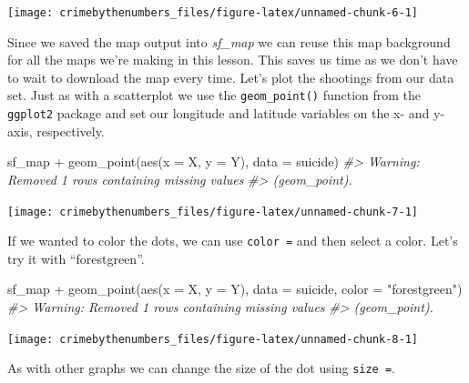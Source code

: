 \documentclass[
]{krantz}
\makeatletter
\newenvironment{Shaded}{\begin{snugshade}}{\end{snugshade}}
\newcommand{\AttributeTok}[1]{\textcolor[rgb]{0.61,0.61,0.61}{#1}}
\newcommand{\CommentTok}[1]{\textcolor[rgb]{0.37,0.37,0.37}{\textit{#1}}}
\newcommand{\FunctionTok}[1]{\textcolor[rgb]{0,0,0}{#1}}
\newcommand{\NormalTok}[1]{#1}
\newcommand{\SpecialCharTok}[1]{\textcolor[rgb]{0,0,0}{#1}}
\newcommand{\StringTok}[1]{\textcolor[rgb]{0.5,0.5,0.5}{#1}}
\newenvironment{kframe}{%
\medskip{}
\setlength{\fboxsep}{.8em}
 \def\at@end@of@kframe{}%
 \ifinner\ifhmode%
  \def\at@end@of@kframe{\end{minipage}}%
  \begin{minipage}{\columnwidth}%
 \fi\fi%
 \def\FrameCommand##1{\hskip\@totalleftmargin \hskip-\fboxsep
 \colorbox{shadecolor}{##1}\hskip-\fboxsep
     \hskip-\linewidth \hskip-\@totalleftmargin \hskip\columnwidth}%
 \MakeFramed {\advance\hsize-\width
   \@totalleftmargin\z@ \linewidth\hsize
   \@setminipage}}%
 {\par\unskip\endMakeFramed%
 \at@end@of@kframe}
\renewenvironment{Shaded}{\begin{kframe}}{\end{kframe}}
\makeatother
\begin{document}
\begin{center}\texttt{[image: crimebythenumbers\_files/figure-latex/unnamed-chunk-6-1]} \end{center}

Since we saved the map output into \emph{sf\_map} we can reuse this map background for all the maps we're making in this lesson. This saves us time as we don't have to wait to download the map every time. Let's plot the shootings from our data set. Just as with a scatterplot we use the \texttt{geom\_point()} function from the \texttt{ggplot2} package and set our longitude and latitude variables on the x- and y-axis, respectively.

\begin{Shaded}
\begin{Highlighting}[]
\NormalTok{sf\_map }\SpecialCharTok{+} \FunctionTok{geom\_point}\NormalTok{(}\FunctionTok{aes}\NormalTok{(}\AttributeTok{x =}\NormalTok{ X, }\AttributeTok{y =}\NormalTok{ Y), }\AttributeTok{data =}\NormalTok{ suicide)}
\CommentTok{\#\textgreater{} Warning: Removed 1 rows containing missing values}
\CommentTok{\#\textgreater{} (geom\_point).}
\end{Highlighting}
\end{Shaded}

\begin{center}\texttt{[image: crimebythenumbers\_files/figure-latex/unnamed-chunk-7-1]} \end{center}

If we wanted to color the dots, we can use \texttt{color\ =} and then select a color. Let's try it with ``forestgreen''.

\begin{Shaded}
\begin{Highlighting}[]
\NormalTok{sf\_map }\SpecialCharTok{+} \FunctionTok{geom\_point}\NormalTok{(}\FunctionTok{aes}\NormalTok{(}\AttributeTok{x =}\NormalTok{ X, }\AttributeTok{y =}\NormalTok{ Y), }\AttributeTok{data =}\NormalTok{ suicide, }\AttributeTok{color =} \StringTok{"forestgreen"}\NormalTok{)}
\CommentTok{\#\textgreater{} Warning: Removed 1 rows containing missing values}
\CommentTok{\#\textgreater{} (geom\_point).}
\end{Highlighting}
\end{Shaded}

\begin{center}\texttt{[image: crimebythenumbers\_files/figure-latex/unnamed-chunk-8-1]} \end{center}

As with other graphs we can change the size of the dot using \texttt{size\ =}.
\end{document}
